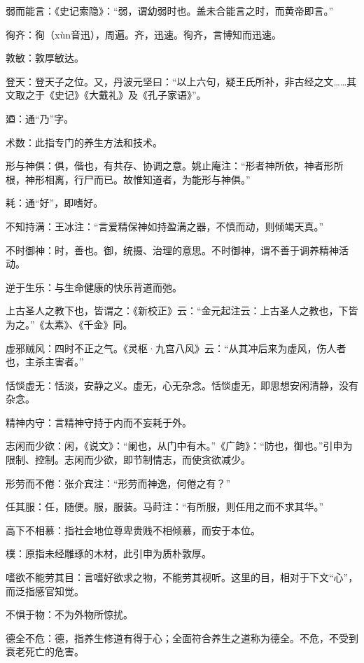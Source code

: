 \documentclass[draft,12pt]{ctexbook}
\begin{document}
\begin{jiaozhu}
	\item 弱而能言：《史记索隐》：“弱，谓幼弱时也。盖未合能言之时，而黄帝即言。”
	\item 徇齐：徇（xùn音迅），周遍。齐，迅速。徇齐，言博知而迅速。
	\item 敦敏：敦厚敏达。
	\item 登天：登天子之位。又，丹波元坚曰：“以上六句，疑王氏所补，非古经之文……其文取之于《史记》《大戴礼》及《孔子家语》”。
	\item 廼：通“乃”字。
	\item 术数：此指专门的养生方法和技术。
	\item 形与神俱：俱，偕也，有共存、协调之意。姚止庵注：“形者神所依，神者形所根，神形相离，行尸而已。故惟知道者，为能形与神俱。”
	\item 耗：通“好”，即嗜好。
	\item 不知持满：王冰注：“言爱精保神如持盈满之器，不慎而动，则倾竭天真。”
	\item 不时御神：时，善也。御，统摄、治理的意思。不时御神，谓不善于调养精神活动。
	\item 逆于生乐：与生命健康的快乐背道而弛。
	\item 上古圣人之教下也，皆谓之：《新校正》云：“金元起注云：上古圣人之教也，下皆为之。”《太素》、《千金》同。
	\item 虚邪贼风：四时不正之气。《灵枢·九宫八风》云：“从其冲后来为虚风，伤人者也，主杀主害者。”
	\item 恬惔虚无：恬淡，安静之义。虚无，心无杂念。恬惔虚无，即思想安闲清静，没有杂念。
	\item 精神内守：言精神守持于内而不妄耗于外。
	\item 志闲而少欲：闲，《说文》：“阑也，从门中有木。”《广韵》：“防也，御也。”引申为限制、控制。志闲而少欲，即节制情志，而使贪欲减少。
	\item 形劳而不倦：张介宾注：“形劳而神逸，何倦之有？”
	\item 任其服：任，随便。服，服装。马莳注：“有所服，则任用之而不求其华。”
	\item 高下不相慕：指社会地位尊卑贵贱不相倾慕，而安于本位。
	\item 樸：原指未经雕琢的木材，此引申为质朴敦厚。
	\item 嗜欲不能劳其目：言嗜好欲求之物，不能劳其视听。这里的目，相对于下文“心”，而泛指感官知觉。
	\item 不惧于物：不为外物所惊扰。
	\item 德全不危：德，指养生修道有得于心；全面符合养生之道称为德全。不危，不受到衰老死亡的危害。
\end{jiaozhu}
\end{document}
